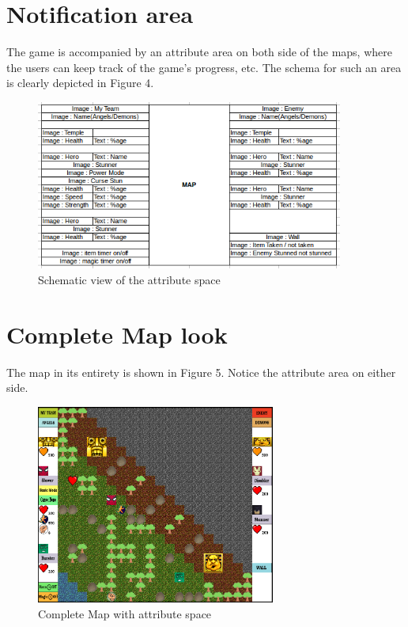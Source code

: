 \documentclass[a4paper]{article}
\begin{document}
\section{Notification area}
The game is accompanied by an attribute area on both side of the maps, where the users can keep track of the game’s progress, etc. The schema for such an area is clearly depicted in Figure 4. 

\begin{figure}[htp]
\centering
\includegraphics[width=0.9\textwidth]{attribute_space.png}
\caption{\label{fig:attribute}Schematic view of the attribute space}
\end{figure}


\section{Complete Map look}
The map in its entirety is shown in Figure 5. Notice the attribute area on either side.

\begin{figure}[htp]
\centering
\includegraphics[width=0.7\textwidth]{Map_Attributes.png}
\caption{\label{fig:attributeMap}Complete Map with attribute space}
\end{figure}
\end{document}
